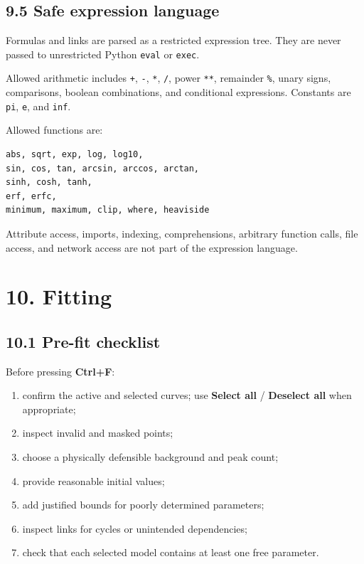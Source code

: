 \documentclass[
  10pt,
  a4paper,
  oneside]{scrreprt}
\providecommand{\tightlist}{%
  \setlength{\itemsep}{0pt}\setlength{\parskip}{0pt}}
\begin{document}
\hypertarget{safe-expression-language}{%
\section{9.5 Safe expression language}\label{safe-expression-language}}

Formulas and links are parsed as a restricted expression tree. They are
never passed to unrestricted Python \texttt{eval} or \texttt{exec}.

Allowed arithmetic includes \texttt{+}, \texttt{-}, \texttt{*},
\texttt{/}, power \texttt{**}, remainder \texttt{\%}, unary signs,
comparisons, boolean combinations, and conditional expressions.
Constants are \texttt{pi}, \texttt{e}, and \texttt{inf}.

Allowed functions are:

\begin{verbatim}
abs, sqrt, exp, log, log10,
sin, cos, tan, arcsin, arccos, arctan,
sinh, cosh, tanh,
erf, erfc,
minimum, maximum, clip, where, heaviside
\end{verbatim}

Attribute access, imports, indexing, comprehensions, arbitrary function
calls, file access, and network access are not part of the expression
language.

\hypertarget{fitting}{%
\chapter{10. Fitting}\label{fitting}}

\hypertarget{pre-fit-checklist}{%
\section{10.1 Pre-fit checklist}\label{pre-fit-checklist}}

Before pressing \textbf{Ctrl+F}:

\begin{enumerate}
\def\labelenumi{\arabic{enumi}.}
\tightlist
\item
  confirm the active and selected curves; use \textbf{Select all} /
  \textbf{Deselect all} when appropriate;
\item
  inspect invalid and masked points;
\item
  choose a physically defensible background and peak count;
\item
  provide reasonable initial values;
\item
  add justified bounds for poorly determined parameters;
\item
  inspect links for cycles or unintended dependencies;
\item
  check that each selected model contains at least one free parameter.
\end{enumerate}
\end{document}
